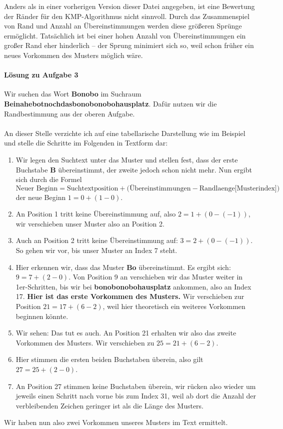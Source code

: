 \documentclass[11pt,a4paper]{scrartcl}
\begin{document}
Anders als in einer vorherigen Version dieser Datei angegeben, ist eine Bewertung der Ränder für den KMP-Algorithmus nicht sinnvoll. Durch das Zusammenspiel von Rand und Anzahl an Übereinstimmungen werden diese größeren Sprünge ermöglicht. Tatsächlich ist bei einer hohen Anzahl von Übereinstimmungen ein großer Rand eher hinderlich -- der Sprung minimiert sich so, weil schon früher ein neues Vorkommen des Musters möglich wäre.
\paragraph{Lösung zu Aufgabe 3}
\label{a2.3:lsg}
Wir suchen das Wort \textbf{Bonobo} im Suchraum \textbf{Beinahebotnochdasbonobonobohausplatz}. Dafür nutzen wir die Randbestimmung aus der oberen Aufgabe. \\\\ An dieser Stelle verzichte ich auf eine tabellarische Darstellung wie im Beispiel und stelle die Schritte im Folgenden in Textform dar:
\begin{enumerate}
\item Wir legen den Suchtext unter das Muster und stellen fest, dass der erste Buchstabe \textbf{B} übereinstimmt, der zweite jedoch schon nicht mehr. Nun ergibt sich durch die Formel
\[\text{Neuer Beginn} = \text{Suchtextposition} + (\text{Übereinstimmungen} - \text{Randlaenge[Musterindex])}\] der neue Beginn $1 = 0 + (1 - 0)$.
\item An Position 1 tritt keine Übereinstimmung auf, also $2 = 1 + (0 - (-1))$, wir verschieben unser Muster also an Position 2.
\item Auch an Position 2 tritt keine Übereinstimmung auf: $3 = 2 + (0 - (-1))$. So gehen wir vor, bis unser Muster an Index 7 steht.
\item Hier erkennen wir, dass das Muster \textbf{Bo} übereinstimmt. Es ergibt sich: $9 = 7 + (2 - 0)$. Von Position 9 an verschieben wir das Muster weiter in 1er-Schritten, bis wir bei \textbf{bonobonobohausplatz} ankommen, also an Index 17. \textbf{Hier ist das erste Vorkommen des Musters.} Wir verschieben zur Position $21 = 17 + (6 - 2)$, weil hier theoretisch ein weiteres Vorkommen beginnen könnte. 
\item Wir sehen: Das tut es auch. An Position 21 erhalten wir also das zweite Vorkommen des Musters. Wir verschieben zu $25 = 21 + (6 - 2)$.
\item Hier stimmen die ersten beiden Buchstaben überein, also gilt $27 = 25 + (2 - 0)$.
\item An Position 27 stimmen keine Buchstaben überein, wir rücken also wieder um jeweils einen Schritt nach vorne bis zum Index 31, weil ab dort die Anzahl der verbleibenden Zeichen geringer ist als die Länge des Musters.
\end{enumerate}
Wir haben nun also zwei Vorkommen unseres Musters im Text ermittelt.
\end{document}
